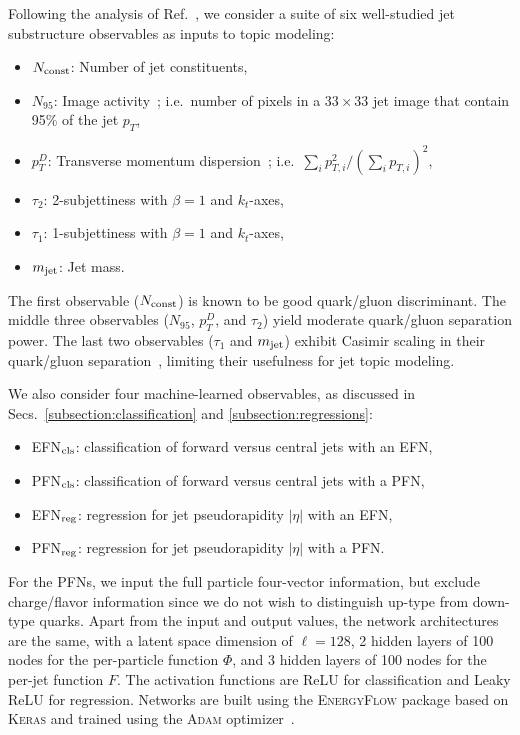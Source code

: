 \documentclass[aps,prd,twocolumn,preprintnumbers,nofootinbib,longbibliography,floatfix]{revtex4-1}
\DeclareRobustCommand{\Secs}[2]{Secs.~\ref{#1} and \ref{#2}}
\DeclareRobustCommand{\Ref}[1]{Ref.~\cite{#1}}
\begin{document}
Following the analysis of \Ref{Komiske:2018vkc}, we consider a suite of six well-studied jet substructure observables as inputs to topic modeling:
%
\begin{itemize}
\item $N_{\rm const}$:  Number of jet constituents,
\item $N_{95}$:  Image activity~\cite{Pumplin:1991kc}; i.e.~number of pixels in a $33 \times 33$ jet image that contain 95\% of the jet $p_T$,
\item $p_T^D$:  Transverse momentum dispersion~\cite{CMS:2013kfa}; i.e.~$\sum_i p_{T,i}^2 / \left(\sum_i p_{T,i} \right)^2$,
\item $\tau_2$:  2-subjettiness  \cite{Thaler:2010tr, Thaler:2011gf} with $\beta = 1$ and $k_t$-axes,
\item $\tau_1$:  1-subjettiness with $\beta = 1$ and $k_t$-axes,
\item $m_{\rm jet}$:  Jet mass.
\end{itemize}
%
The first observable ($N_{\rm const}$) is known to be good quark/gluon discriminant.
%
The middle three observables ($N_{95}$, $p_T^D$, and $\tau_2$) yield moderate quark/gluon separation power.
%
The last two observables ($\tau_1$ and $m_{\rm jet}$) exhibit Casimir scaling in their quark/gluon separation~\cite{Larkoski:2013eya}, limiting their usefulness for jet topic modeling.


We also consider four machine-learned observables, as discussed in \Secs{subsection:classification}{subsection:regressions}:
%
\begin{itemize}
\item EFN$_{\rm cls}$:  classification of forward versus central jets with an EFN,  
\item PFN$_{\rm cls}$:  classification of forward versus central jets with a PFN,
\item EFN$_{\rm reg}$:  regression for jet pseudorapidity $|\eta|$ with an EFN,
\item PFN$_{\rm reg}$:  regression for jet pseudorapidity $|\eta|$ with a PFN.
\end{itemize}
%
For the PFNs, we input the full particle four-vector information, but exclude charge/flavor information since we do not wish to distinguish up-type from down-type quarks.
%
Apart from the input and output values, the network architectures are the same, with a latent space dimension of $\ell = 128$, 2 hidden layers of 100 nodes for the per-particle function $\Phi$, and 3 hidden layers of 100 nodes for the per-jet function $F$.
%
The activation functions are ReLU for classification and Leaky ReLU for regression.
%
Networks are built using the \textsc{EnergyFlow} package \cite{energyflow}  based on \textsc{Keras} \cite{chollet2015keras} and trained using the \textsc{Adam} optimizer~\cite{kingma2014adam}.
\end{document}
